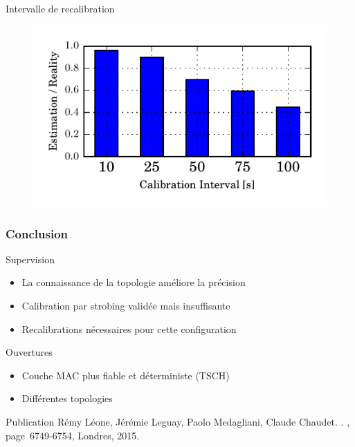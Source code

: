 \begin{frame}{Intervalle de recalibration}
  \begin{figure}[ht]
    \centering
    \includegraphics[width=\textwidth]{figures/ratio_recalibration.pdf}
  \end{figure}
\end{frame}

\begin{frame}\frametitle{Conclusion}

  \begin{block}{Supervision}
      \begin{itemize}
        \item La connaissance de la topologie améliore la précision
        \item Calibration par strobing validée mais insuffisante
        \item Recalibrations nécessaires pour cette configuration
      \end{itemize}
  \end{block}

  \begin{block}{Ouvertures}
    \begin{itemize}
      \item Couche MAC plus fiable et déterministe (TSCH)
      \item Différentes topologies
    \end{itemize}
  \end{block}


\end{frame}

\begin{frame}{Publication}
    Rémy Léone, Jérémie Leguay, Paolo Medagliani, Claude Chaudet.
    .
    , page~6749-6754, Londres, 2015.  
\end{frame}